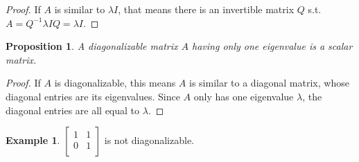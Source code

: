 \documentclass[12pt]{article}
\theoremstyle{plain}
\newtheorem{proposition}[theorem]{Proposition}
\theoremstyle{definition}
\newtheorem{example}[theorem]{Example}
\theoremstyle{remark}
\begin{document}
\begin{proof}
If $A$ is similar to $\lambda I$, that means there is an invertible matrix $Q$ s.t. $A = Q^{-1} \lambda I Q = \lambda I$.
\end{proof}

\begin{proposition}
A diagonalizable matrix $A$ having only one eigenvalue is a scalar matrix.
\end{proposition}

\begin{proof}
If $A$ is diagonalizable, this means $A$ is similar to a diagonal matrix, whose diagonal entries are its eigenvalues. Since $A$ only has one eigenvalue $\lambda$, the diagonal entries are all equal to $\lambda$.
\end{proof}

\begin{example}
$\begin{bmatrix}
1 & 1 \\
0 & 1 \\
\end{bmatrix}$ is not diagonalizable.
\end{example}
\end{document}
